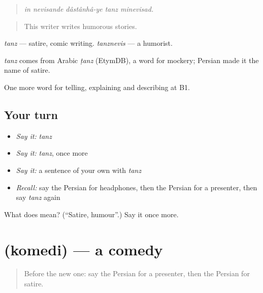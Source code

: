 \begin{quote}
\emph{in nevisande dâstânhâ-ye tanz minevisad.}
\end{quote}

\begin{quote}
This writer writes humorous stories.
\end{quote}

\emph{tanz} — satire, comic writing. \emph{tanznevis} — a humorist.

\begin{cousinweb}
\emph{tanz} comes from Arabic \emph{ṭanz} (EtymDB), a word for mockery; Persian made it the name of satire.
\end{cousinweb}

\begin{grammarlens}[title={What you've built}]
One more word for telling, explaining and describing at B1.
\end{grammarlens}

\subsection*{Your turn}
\begin{itemize}
\raggedright
  \item \emph{Say it:} \emph{tanz}
  \item \emph{Say it:} \emph{tanz}, once more
  \item \emph{Say it:} a sentence of your own with \emph{tanz}
  \item \emph{Recall:} say the Persian for headphones, then the Persian for a presenter, then say \emph{tanz} again
\end{itemize}

\begin{tcolorbox}[breakable,colback=teal!4,colframe=teal!35!black,title={Before you move on}]
What does  mean? (\textquotedblleft{}Satire, humour\textquotedblright{}.) Say it once more.
\end{tcolorbox}
\section[\texorpdfstring{\fa{کمدی} (komedi)}{کمدی (komedi)}]{ (komedi) — a comedy}

\label{lesson:FA-C533-komedi}



\begin{quote}
Before the new one: say the Persian for a presenter, then the Persian for satire.
\end{quote}

